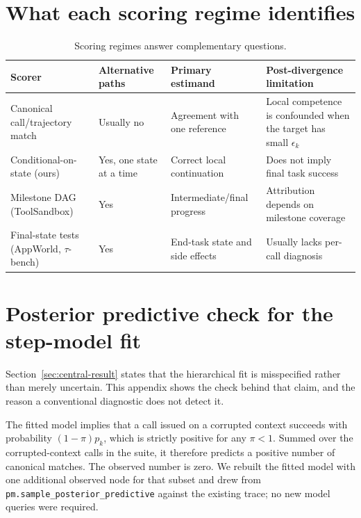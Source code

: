 \documentclass{article}
\begin{document}
\section{What each scoring regime identifies}
\label{app:scorers}

\begin{table}[h]
\centering
\caption{Scoring regimes answer complementary questions.}
\scriptsize
\begin{tabular}{@{}p{}p{}p{}p{}@{}}
\toprule
Scorer & Alternative paths & Primary estimand & Post-divergence limitation \\
\midrule
Canonical call/trajectory match & Usually no & Agreement with one reference & Local competence is confounded when the target has small $\epsilon_k$ \\
Conditional-on-state (ours) & Yes, one state at a time & Correct local continuation & Does not imply final task success \\
Milestone DAG (ToolSandbox) & Yes & Intermediate/final progress & Attribution depends on milestone coverage \\
Final-state tests (AppWorld, $\tau$-bench) & Yes & End-task state and side effects & Usually lacks per-call diagnosis \\
\bottomrule
\end{tabular}
\end{table}

\section{Posterior predictive check for the step-model fit}
\label{app:ppc}

Section~\ref{sec:central-result} states that the hierarchical fit is misspecified rather than
merely uncertain. This appendix shows the check behind that claim, and the reason a
conventional diagnostic does not detect it.

The fitted model implies that a call issued on a corrupted context succeeds with
probability $(1-\pi)p_k$, which is strictly positive for any $\pi<1$. Summed over the
corrupted-context calls in the suite, it therefore predicts a positive number of canonical
matches. The observed number is zero. We rebuilt the fitted model with one additional
observed node for that subset and drew from
\texttt{pm.sample\_posterior\_predictive} against the existing trace; no new model queries
were required.
\end{document}
